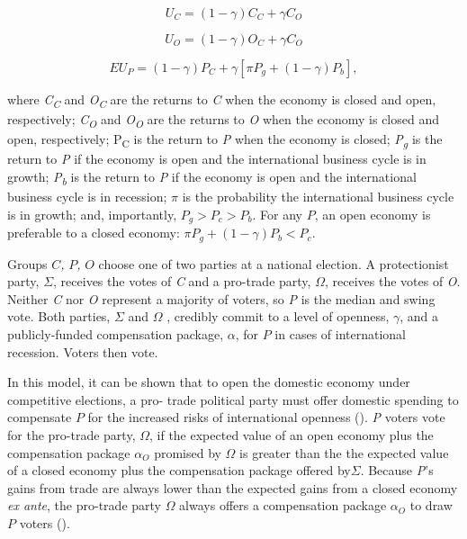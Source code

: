 \documentclass[12pt]{report}
\begin{document}
\begin{equation} U_{C}=(1-\gamma)C_{C}+\gamma C_{O} \end{equation}


\begin{equation} U_{O}=(1-\gamma)O_{C}+\gamma C_{O} \end{equation}


\begin{equation} EU_{P}=(1-\gamma)P_{C}+\gamma[\pi P_{g}+(1-\gamma)P_{b}], \end{equation}


\noindent where \emph{C\textsubscript{C}} and \emph{O\textsubscript{C}} are the returns to \emph{C}
when the economy is closed and open, respectively; \emph{C\textsubscript{O}} and
\emph{O\textsubscript{O}} are the returns to \emph{O} when the economy is closed and open,
respectively; P\textsubscript{C} is the return to \emph{P} when the economy is closed;
\emph{P\textsubscript{g}} is the return to \emph{P} if the economy is open and the international
business cycle is in growth; \emph{P\textsubscript{b}} is the return to \emph{P} if the economy is
open and the international business cycle is in recession; $\pi$ is the probability the
international business cycle is in growth; and, importantly, $P_{g}>P_{c}>P_{b}$. For any
\emph{$P$}, an open economy is preferable to a closed economy: $\pi P_{g}+(1-\gamma)P_{b}<P_{c}$.

Groups\emph{ $C$,} \emph{$P$, }$O$ choose one of two parties at a national election. A protectionist
party, $\Sigma$, receives the votes of \emph{C} and a pro-trade party, $\Omega$, receives the votes
of \emph{O}. Neither \emph{C} nor \emph{O} represent a majority of voters, so \emph{P} is the median
and swing vote. Both parties, $\Sigma$ and $\Omega$ , credibly commit to a level of openness,
$\gamma$, and a publicly-funded compensation package, $\alpha$, for $P$ in cases of international
recession. Voters then vote.

In this model, it can be shown that to open the domestic economy under competitive elections, a pro-
trade political party must offer domestic spending to compensate $P$ for the increased risks of
international openness (\citealt[236]{Adsera:2002vt}). \emph{P} voters vote for the pro-trade party,
$\Omega$, if the expected value of an open economy plus the compensation package $\alpha_{O}$
promised by $\Omega$ is greater than the the expected value of a closed economy plus the
compensation package offered by$\Sigma$. Because \emph{P}'s gains from trade are always lower than
the expected gains from a closed economy \emph{ex ante},  the pro-trade party $\Omega$ always offers
a compensation package $\alpha_{O}$ to draw $P$ voters (\citealt[236]{Adsera:2002vt}).
\end{document}
